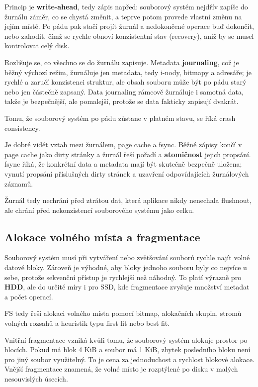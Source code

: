 \documentclass[11pt,a4paper]{article}
\begin{document}
Princip je \textbf{write-ahead}, tedy zápis napřed: souborový systém nejdřív zapíše do žurnálu záměr, co se chystá změnit, a teprve potom provede vlastní změnu na jejím místě. Po pádu pak stačí projít žurnál a nedokončené operace buď dokončit, nebo zahodit, čímž se rychle obnoví konzistentní stav (recovery), aniž by se musel kontrolovat celý disk.

Rozlišuje se, co všechno se do žurnálu zapisuje. Metadata \textbf{journaling}, což je běžný výchozí režim, žurnáluje jen metadata, tedy i-nody, bitmapy a adresáře; je rychlé a zaručí konzistenci struktur, ale obsah souboru může být po pádu starý nebo jen částečně zapsaný. Data journaling rámcově žurnáluje i samotná data, takže je bezpečnější, ale pomalejší, protože se data fakticky zapisují dvakrát.

Tomu, že souborový systém po pádu zůstane v platném stavu, se říká crash consistency.

Je dobré vidět vztah mezi žurnálem, page cache a fsync. Běžné zápisy končí v page cache jako dirty stránky a žurnál řeší pořadí a \textbf{atomičnost} jejich propsání. fsync říká, že konkrétní data a metadata mají být skutečně bezpečně uložena; vynutí propsání příslušných dirty stránek a uzavření odpovídajících žurnálových záznamů.

Žurnál tedy nechrání před ztrátou dat, která aplikace nikdy nenechala flushnout, ale chrání před nekonzistencí souborového systému jako celku.

\subsection*{Alokace volného místa a fragmentace}

Souborový systém musí při vytváření nebo zvětšování souborů rychle najít volné datové bloky. Zároveň je výhodné, aby bloky jednoho souboru byly co nejvíce u sebe, protože sekvenční přístup je rychlejší než náhodný. To platí výrazně pro \textbf{HDD}, ale do určité míry i pro SSD, kde fragmentace zvyšuje množství metadat a počet operací.

FS tedy řeší alokaci volného místa pomocí bitmap, alokačních skupin, stromů volných rozsahů a heuristik typu first fit nebo best fit.

Vnitřní fragmentace vzniká kvůli tomu, že souborový systém alokuje prostor po blocích. Pokud má blok 4 KiB a soubor má 1 KiB, zbytek posledního bloku není pro jiný soubor využitelný. To je cena za jednoduchost a rychlost blokové alokace. Vnější fragmentace znamená, že volné místo je rozptýlené po disku v malých nesouvislých úsecích.
\end{document}
